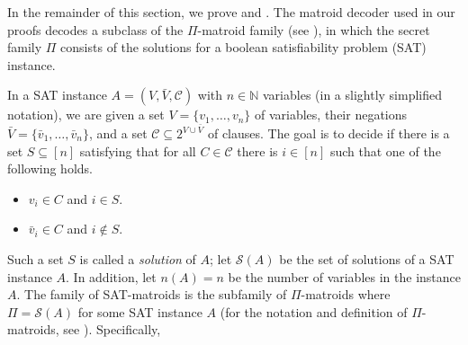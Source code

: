 \documentclass[11pt,letter]{article}
\newcommand{\cC}{{\mathcal{C}}}
\begin{document}
	 In the remainder of this section, we prove  and  . The matroid decoder used in our proofs decodes a subclass of the $\Pi$-matroid family (see ), in which the secret family $\Pi$ consists of the solutions for a  {\sc boolean satisfiability problem (SAT)} instance. 
	
	
	In a SAT instance $A = (V,\bar{V},\cC)$ with $n \in \mathbb{N}$ variables (in a slightly simplified notation), we are given a set $V = \{v_1, \ldots,v_n\}$ of variables, their negations $\bar{V} = \{\bar{v}_1,\ldots, \bar{v}_n\}$, and a set $\cC \subseteq 2^{V \cup \bar{V}}$ of clauses. 
	The goal is to decide if there is a set $S \subseteq [n]$ %
	satisfying that for all $C \in \cC$ there is $i \in [n]$ such that one of the following holds.   \begin{itemize}
		\item $v_i \in C$ and $i \in S$.
		\item $\bar{v}_i \in C$ and $i \notin S$. 
	\end{itemize} Such a set $S$ is called a {\em solution} of $A$; let $\mathcal{S}(A)$ be the set of solutions of a SAT instance $A$. In addition, let $n(A) = n$ be the number of variables in the instance $A$. 
	The family of SAT-matroids is the subfamily of $\Pi$-matroids where $\Pi = \mathcal{S}(A)$ for some SAT instance $A$ (for the notation and definition of $\Pi$-matroids, see ). Specifically, 
	
\end{document}
